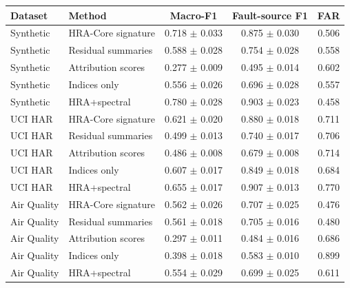 \begin{tabularx}{\textwidth}{l>{\raggedright\arraybackslash}Xccc}
\toprule
Dataset & Method & Macro-F1 & Fault-source F1 & FAR \\
\midrule
Synthetic & HRA-Core signature & 0.718 $\pm$ 0.033 & 0.875 $\pm$ 0.030 & 0.506 \\
Synthetic & Residual summaries & 0.588 $\pm$ 0.028 & 0.754 $\pm$ 0.028 & 0.558 \\
Synthetic & Attribution scores & 0.277 $\pm$ 0.009 & 0.495 $\pm$ 0.014 & 0.602 \\
Synthetic & Indices only & 0.556 $\pm$ 0.026 & 0.696 $\pm$ 0.028 & 0.557 \\
Synthetic & HRA+spectral & 0.780 $\pm$ 0.028 & 0.903 $\pm$ 0.023 & 0.458 \\
UCI HAR & HRA-Core signature & 0.621 $\pm$ 0.020 & 0.880 $\pm$ 0.018 & 0.711 \\
UCI HAR & Residual summaries & 0.499 $\pm$ 0.013 & 0.740 $\pm$ 0.017 & 0.706 \\
UCI HAR & Attribution scores & 0.486 $\pm$ 0.008 & 0.679 $\pm$ 0.008 & 0.714 \\
UCI HAR & Indices only & 0.607 $\pm$ 0.017 & 0.849 $\pm$ 0.018 & 0.684 \\
UCI HAR & HRA+spectral & 0.655 $\pm$ 0.017 & 0.907 $\pm$ 0.013 & 0.770 \\
Air Quality & HRA-Core signature & 0.562 $\pm$ 0.026 & 0.707 $\pm$ 0.025 & 0.476 \\
Air Quality & Residual summaries & 0.561 $\pm$ 0.018 & 0.705 $\pm$ 0.016 & 0.480 \\
Air Quality & Attribution scores & 0.297 $\pm$ 0.011 & 0.484 $\pm$ 0.016 & 0.686 \\
Air Quality & Indices only & 0.398 $\pm$ 0.018 & 0.583 $\pm$ 0.010 & 0.899 \\
Air Quality & HRA+spectral & 0.554 $\pm$ 0.029 & 0.699 $\pm$ 0.025 & 0.611 \\
\bottomrule
\end{tabularx}
